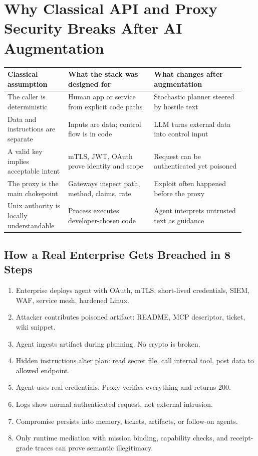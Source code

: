 \documentclass[10pt]{article}
\begin{document}
\section{Why Classical API and Proxy Security Breaks After AI Augmentation}
\begin{longtable}{@{}p{0.24\linewidth}p{0.34\linewidth}p{0.36\linewidth}@{}}
\toprule
\textbf{Classical assumption} & \textbf{What the stack was designed for} & \textbf{What changes after augmentation} \\
\midrule
\endhead
The caller is deterministic & Human app or service from explicit code paths & Stochastic planner steered by hostile text \\
Data and instructions are separate & Inputs are data; control flow is in code & LLM turns external data into control input \\
A valid key implies acceptable intent & mTLS, JWT, OAuth prove identity and scope & Request can be authenticated yet poisoned \\
The proxy is the main chokepoint & Gateways inspect path, method, claims, rate & Exploit often happened before the proxy \\
Unix authority is locally understandable & Process executes developer-chosen code & Agent interprets untrusted text as guidance \\
\bottomrule
\end{longtable}

\subsection{How a Real Enterprise Gets Breached in 8 Steps}
\begin{enumerate}
  \item Enterprise deploys agent with OAuth, mTLS, short-lived credentials, SIEM, WAF, service mesh, hardened Linux.
  \item Attacker contributes poisoned artifact: README, MCP descriptor, ticket, wiki snippet.
  \item Agent ingests artifact during planning. No crypto is broken.
  \item Hidden instructions alter plan: read secret file, call internal tool, post data to allowed endpoint.
  \item Agent uses real credentials. Proxy verifies everything and returns 200.
  \item Logs show normal authenticated request, not external intrusion.
  \item Compromise persists into memory, tickets, artifacts, or follow-on agents.
  \item Only runtime mediation with mission binding, capability checks, and receipt-grade traces can prove semantic illegitimacy.
\end{enumerate}
\end{document}
